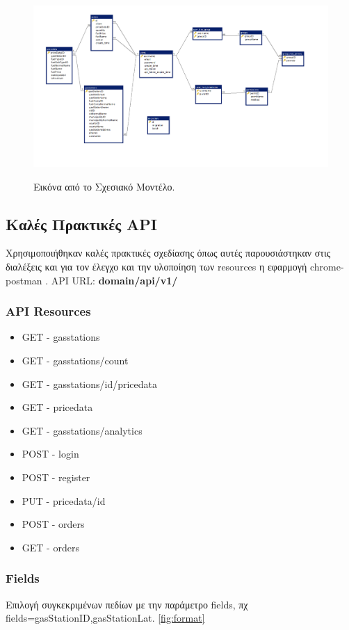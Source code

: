 \begin{figure}[H]
  \caption{Εικόνα από το Σχεσιακό Μοντέλο.}
  \centering
    \includegraphics[width=1\textwidth]{img/db-schema.png}
    \label{fig:db}
\end{figure}

\subsection{Καλές Πρακτικές API}
Χρησιμοποιήθηκαν καλές πρακτικές σχεδίασης όπως αυτές παρουσιάστηκαν στις διαλέξεις και για τον έλεγχο και την υλοποίηση των resources η εφαρμογή chrome-postman \cite{chrome-postman}. API URL: \textbf{domain/api/v1/}

\subsubsection{API Resources}
\begin{itemize}
\item GET - gasstations
\item GET - gasstations/count
\item GET - gasstations/id/pricedata
\item GET - pricedata
\item GET - gasstations/analytics
\item POST - login
\item POST - register
\item PUT - pricedata/id
\item POST - orders
\item GET - orders
\end{itemize}

\subsubsection{Fields}
Επιλογή συγκεκριμένων πεδίων με την παράμετρο fields, πχ fields=gasStationID,gasStationLat. \ref{fig:format}

